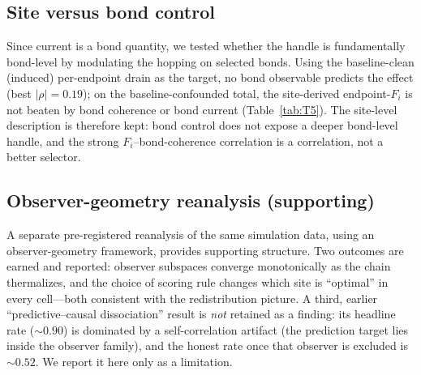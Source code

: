 \documentclass[aps,pra,reprint,amsmath,amssymb,longbibliography,floatfix]{revtex4-2}
\newcommand{\Fi}{F_i}
\begin{document}
\subsection{Site versus bond control}
Since current is a bond quantity, we tested whether the handle is fundamentally bond-level by
modulating the hopping on selected bonds. Using the baseline-clean (induced) per-endpoint drain as
the target, no bond observable predicts the effect (best $|\rho|=0.19$); on the
baseline-confounded total, the site-derived endpoint-$\Fi$ is not beaten by bond coherence or bond
current (Table~\ref{tab:T5}). The site-level description is therefore kept: bond control does not
expose a deeper bond-level handle, and the strong $\Fi$--bond-coherence correlation is a
correlation, not a better selector.

\begin{table}[tbp]
\centering
\caption{Bond/hopping modulation. ``induced'' is the per-endpoint drain change due to the
modulation (the clean bond-control signal); ``total'' is baseline-confounded.}
\label{tab:T5}

\end{table}

\subsection{Observer-geometry reanalysis (supporting)}
A separate pre-registered reanalysis of the same simulation data, using an observer-geometry
framework, provides supporting structure. Two outcomes are earned and reported: observer subspaces
converge monotonically as the chain thermalizes, and the choice of scoring rule changes which site
is ``optimal'' in every cell---both consistent with the redistribution picture. A third, earlier
``predictive--causal dissociation'' result is \emph{not} retained as a finding: its headline rate
($\sim0.90$) is dominated by a self-correlation artifact (the prediction target lies inside the
observer family), and the honest rate once that observer is excluded is $\sim0.52$. We report it
here only as a limitation.
\end{document}
